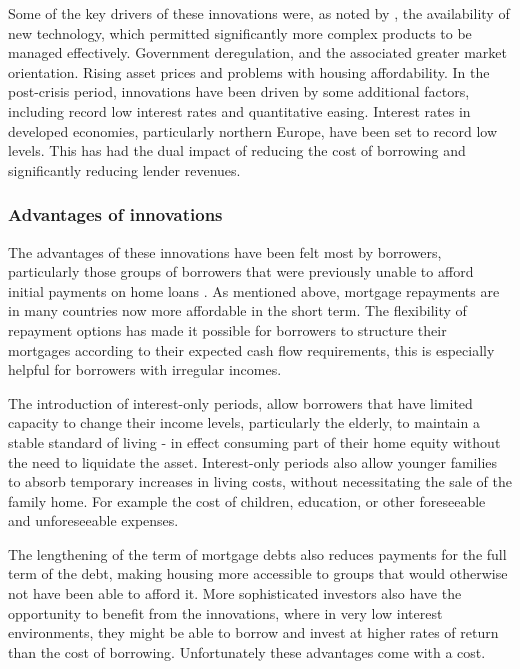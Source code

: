 \documentclass[
]{book}
\begin{document}
Some of the key drivers of these innovations were, as noted by \citet{Alpanda2017}, the availability of new technology, which permitted significantly more complex products to be managed effectively. Government deregulation, and the associated greater market orientation. Rising asset prices and problems with housing affordability. In the post-crisis period, innovations have been driven by some additional factors, including record low interest rates and quantitative easing. Interest rates in developed economies, particularly northern Europe, have been set to record low levels. This has had the dual impact of reducing the cost of borrowing and significantly reducing lender revenues.

\hypertarget{advantages-of-innovations}{%
\subsubsection{Advantages of innovations}\label{advantages-of-innovations}}

The advantages of these innovations have been felt most by borrowers, particularly those groups of borrowers that were previously unable to afford initial payments on home loans \citep{scanlon2008}. As mentioned above, mortgage repayments are in many countries now more affordable in the short term. The flexibility of repayment options has made it possible for borrowers to structure their mortgages according to their expected cash flow requirements, this is especially helpful for borrowers with irregular incomes.

The introduction of interest-only periods, allow borrowers that have limited capacity to change their income levels, particularly the elderly, to maintain a stable standard of living \citep{scanlon2008} - in effect consuming part of their home equity without the need to liquidate the asset. Interest-only periods also allow younger families to absorb temporary increases in living costs, without necessitating the sale of the family home. For example the cost of children, education, or other foreseeable and unforeseeable expenses.

The lengthening of the term of mortgage debts also reduces payments for the full term of the debt, making housing more accessible to groups that would otherwise not have been able to afford it. More sophisticated investors also have the opportunity to benefit from the innovations, where in very low interest environments, they might be able to borrow and invest at higher rates of return than the cost of borrowing. Unfortunately these advantages come with a cost.
\end{document}
